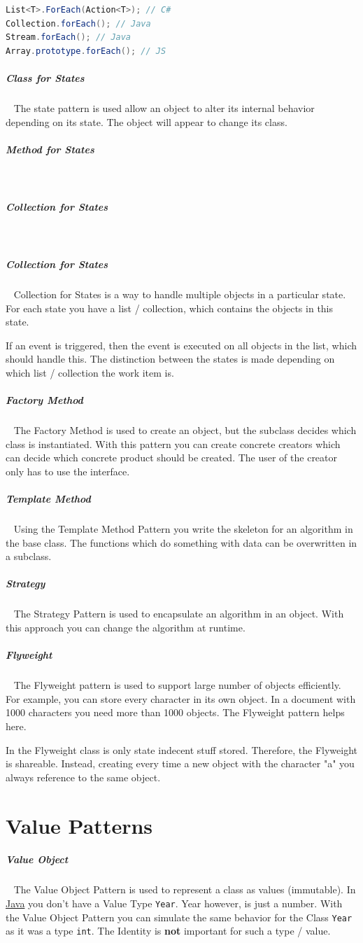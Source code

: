 \documentclass[8pt,twoside,landscape]{extarticle}
\begin{document}
\begin{multicols}{4}
\begin{lstlisting}[language=csharp,label=lst:internal-iterator-examples,caption={Internal Iterator Examples},captionpos=b,numbers=none]
List<T>.ForEach(Action<T>); // C#
Collection.forEach(); // Java
Stream.forEach(); // Java
Array.prototype.forEach(); // JS
\end{lstlisting}
\subparagraph{Class for States} \
\label{sec:org2042beb}
The state pattern is used allow an object to alter its internal behavior depending on its state.
The object will appear to change its class.
\subparagraph{Method for States} \
\label{sec:org3901349}
\subparagraph{Collection for States} \
\label{sec:org0b97703}
\subparagraph{Collection for States} \
\label{sec:orgf098759}
Collection for States is a way to handle multiple objects in a particular state.
For each state you have a list / collection, which contains the objects in this state.

If an event is triggered, then the event is executed on all objects in the list, which should handle this.
The distinction between the states is made depending on which list / collection the work item is.
\subparagraph{Factory Method} \
\label{sec:org6180847}
The Factory Method is used to create an object, but the subclass decides which class is instantiated.
With this pattern you can create concrete creators which can decide which concrete product should be created.
The user of the creator only has to use the interface.
\subparagraph{Template Method} \
\label{sec:orga3ef0b2}
Using the Template Method Pattern you write the skeleton for an algorithm in the base class.
The functions which do something with data can be overwritten in a subclass.
\subparagraph{Strategy} \
\label{sec:org429ba7c}
The Strategy Pattern is used to encapsulate an algorithm in an object.
With this approach you can change the algorithm at runtime.
\subparagraph{Flyweight} \
\label{sec:orgaddef9d}
The Flyweight pattern is used to support large number of objects efficiently.
For example, you can store every character in its own object.
In a document with 1000 characters you need more than 1000 objects.
The Flyweight pattern helps here.

In the Flyweight class is only state indecent stuff stored.
Therefore, the Flyweight is shareable.
Instead, creating every time a new object with the character "a" you always reference to the same object.
\section{Value Patterns}
\label{sec:orgec13aed}
\subparagraph{Value Object} \
\label{sec:org664e37d}
The Value Object Pattern is used to represent a class as values (immutable).
In \href{../../../roam/20201116150053-java.org}{Java} you don't have a Value Type \texttt{Year}.
Year however, is just a number.
With the Value Object Pattern you can simulate the same behavior for the Class \texttt{Year} as it was a type \texttt{int}.
The Identity is \textbf{not} important for such a type / value.



\end{multicols}
\end{document}
